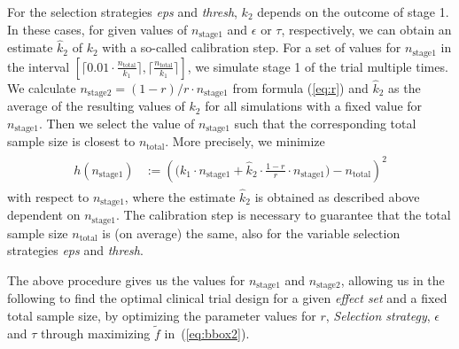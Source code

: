 \documentclass[bimj,fleqn]{w-art}
\theoremstyle{plain}
\theoremstyle{definition}
\begin{document}
For the selection strategies \emph{eps} and \emph{thresh}, $k_2$ depends on the outcome of stage 1.
In these cases, for given values of $n_{\text{stage1}}$ and $\epsilon$ or $\tau$, respectively, we can obtain an estimate $\hat{k}_2$ of $k_2$ with a so-called calibration step.
For a set of values for $n_{\text{stage1}}$ in the interval $\left[ \lceil 0.01 \cdot \frac{n_{\text{total}}}{k_1} \rceil, \lceil \frac{n_{\text{total}}}{k_1} \rceil \right]$, we simulate stage 1 of the trial multiple times.
We calculate $n_{\text{stage2}} = (1-r)/r\cdot n_{\text{stage1}}$ from formula (\ref{eq:r}) and $\hat{k}_2$ as the average of the resulting values of $k_2$ for all simulations with a fixed value for $n_{\text{stage1}}$.
Then we select the value of $n_{\text{stage1}}$ such that the corresponding total sample size is closest to $n_{\text{total}}$.
More precisely, we minimize
\begin{align}
  \label{eq:targettreat}
  \begin{split}
  h(n_{\text{stage1}}) &:= \left( \Big(k_1 \cdot n_{\text{stage1}} + \hat{k}_2 \cdot %
  \frac{1-r}{r} \cdot n_{\text{stage1}}
  \Big) - n_{\text{total}} \right)^2
  \end{split}
\end{align}
with respect to $n_{\text{stage1}}$, where the estimate $\hat{k}_2$ is obtained as described above dependent on $n_{\text{stage1}}$. 
The calibration step is necessary to guarantee that the total sample size $n_{\text{total}}$ is (on average) the same, also for the variable selection strategies \emph{eps} and \emph{thresh}.

The above procedure gives us the values for $n_{\text{stage1}}$ and $n_{\text{stage2}}$, allowing us in the following to find the optimal clinical trial design for a given \emph{effect set} and a fixed total sample size, by optimizing the parameter values for $r$, \emph{Selection strategy}, $\epsilon$ and $\tau$ through maximizing $\tilde f$ in~(\ref{eq:bbox2}).
\end{document}
